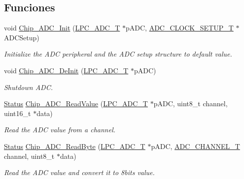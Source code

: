 \subsection*{Funciones}
\begin{DoxyCompactItemize}
\item 
void \hyperlink{group___a_d_c__18_x_x__43_x_x_ga459b17621657a66281f2bc9baae3626c}{Chip\+\_\+\+A\+D\+C\+\_\+\+Init} (\hyperlink{struct_l_p_c___a_d_c___t}{L\+P\+C\+\_\+\+A\+D\+C\+\_\+T} $\ast$p\+A\+DC, \hyperlink{struct_a_d_c___c_l_o_c_k___s_e_t_u_p___t}{A\+D\+C\+\_\+\+C\+L\+O\+C\+K\+\_\+\+S\+E\+T\+U\+P\+\_\+T} $\ast$A\+D\+C\+Setup)
\begin{DoxyCompactList}\small\item\em Initialize the A\+DC peripheral and the A\+DC setup structure to default value. \end{DoxyCompactList}\item 
void \hyperlink{group___a_d_c__18_x_x__43_x_x_ga749cff51066bd49acaca0497d78f3332}{Chip\+\_\+\+A\+D\+C\+\_\+\+De\+Init} (\hyperlink{struct_l_p_c___a_d_c___t}{L\+P\+C\+\_\+\+A\+D\+C\+\_\+T} $\ast$p\+A\+DC)
\begin{DoxyCompactList}\small\item\em Shutdown A\+DC. \end{DoxyCompactList}\item 
\hyperlink{group___l_p_c___types___public___types_ga67a0db04d321a74b7e7fcfd3f1a3f70b}{Status} \hyperlink{group___a_d_c__18_x_x__43_x_x_gab6374a3aa75b052970c472ee2e9f600e}{Chip\+\_\+\+A\+D\+C\+\_\+\+Read\+Value} (\hyperlink{struct_l_p_c___a_d_c___t}{L\+P\+C\+\_\+\+A\+D\+C\+\_\+T} $\ast$p\+A\+DC, uint8\+\_\+t channel, uint16\+\_\+t $\ast$data)
\begin{DoxyCompactList}\small\item\em Read the A\+DC value from a channel. \end{DoxyCompactList}\item 
\hyperlink{group___l_p_c___types___public___types_ga67a0db04d321a74b7e7fcfd3f1a3f70b}{Status} \hyperlink{group___a_d_c__18_x_x__43_x_x_ga5dc774072fa55b145e57a25c1a146535}{Chip\+\_\+\+A\+D\+C\+\_\+\+Read\+Byte} (\hyperlink{struct_l_p_c___a_d_c___t}{L\+P\+C\+\_\+\+A\+D\+C\+\_\+T} $\ast$p\+A\+DC, \hyperlink{group___a_d_c__18_x_x__43_x_x_ga30ee7058bc7cc1daff718b29b42bed4e}{A\+D\+C\+\_\+\+C\+H\+A\+N\+N\+E\+L\+\_\+T} channel, uint8\+\_\+t $\ast$data)
\begin{DoxyCompactList}\small\item\em Read the A\+DC value and convert it to 8bits value. \end{DoxyCompactList}\item 

\end{DoxyCompactItemize}
